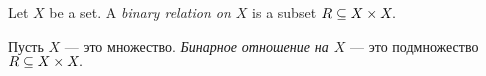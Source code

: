\documentclass[../main/CT4S-EN-RU]{subfiles}
\begin{document}

\subsubsection{}

\begin{definitionENG}\label{def:binary relation}
Let $X$ be a set. A {\em binary relation on $X$} is a subset $R\ss X\times X.$ 
\end{definitionENG}

\begin{definitionRUS}\label{def:binary relation}
Пусть $X$ — это множество. {\em Бинарное отношение на $X$} — это подмножество $R\ss X\times X.$ 
\end{definitionRUS}
\end{document}
